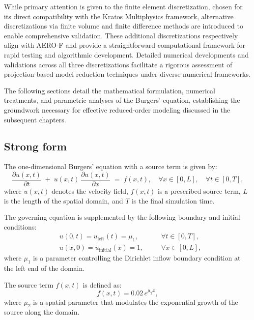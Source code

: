 While primary attention is given to the finite element discretization, chosen for its direct compatibility with the Kratos Multiphysics framework, alternative discretizations via finite volume and finite difference methods are introduced to enable comprehensive validation. These additional discretizations respectively align with AERO-F and provide a straightforward computational framework for rapid testing and algorithmic development. Detailed numerical developments and validations across all three discretizations facilitate a rigorous assessment of projection-based model reduction techniques under diverse numerical frameworks.

The following sections detail the mathematical formulation, numerical treatments, and parametric analyses of the Burgers' equation, establishing the groundwork necessary for effective reduced-order modeling discussed in the subsequent chapters.


\subsection{Strong form}

The one-dimensional Burgers' equation with a source term is given by:
\begin{equation}
\frac{\partial u(x,t)}{\partial t} 
\;+\; 
u(x,t)\,\frac{\partial u(x,t)}{\partial x} 
\;=\; 
f(x,t),
\quad
\forall x \in [0, L], 
\quad
\forall t \in [0, T],
\end{equation}
where \( u(x,t) \) denotes the velocity field, \( f(x,t) \) is a prescribed source term, \( L \) is the length of the spatial domain, and \( T \) is the final simulation time.

The governing equation is supplemented by the following boundary and initial conditions:
\begin{equation}
\begin{aligned}
&u(0, t) = u_{\text{left}}(t) = \mu_1, 
&&\quad \forall t \in [0, T], \\
&u(x, 0) = u_{\text{initial}}(x) = 1, 
&&\quad \forall x \in [0, L],
\end{aligned}
\end{equation}
where $\mu_1$ is a parameter controlling the Dirichlet inflow boundary condition at the left end of the domain.

The source term $f(x,t)$ is defined as:
\begin{equation}
f(x,t) = 0.02 \, e^{\mu_2 x},
\end{equation}
where $\mu_2$ is a spatial parameter that modulates the exponential growth of the source along the domain.

